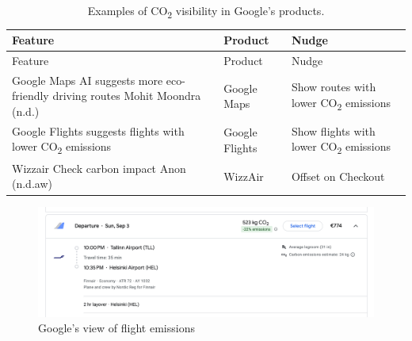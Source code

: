 \documentclass[
  letterpaper,
  DIV=11,
  numbers=noendperiod]{scrartcl}
\begin{document}
\begin{longtable}[]{@{}
  >{\raggedright\arraybackslash}p{}
  >{\raggedright\arraybackslash}p{}
  >{\raggedright\arraybackslash}p{}@{}}
\caption{Examples of CO\textsubscript{2} visibility in Google's
products.}\tabularnewline
\toprule\noalign{}
\begin{minipage}[b]{\linewidth}\raggedright
Feature
\end{minipage} & \begin{minipage}[b]{\linewidth}\raggedright
Product
\end{minipage} & \begin{minipage}[b]{\linewidth}\raggedright
Nudge
\end{minipage} \\
\midrule\noalign{}
\endfirsthead
\toprule\noalign{}
\begin{minipage}[b]{\linewidth}\raggedright
Feature
\end{minipage} & \begin{minipage}[b]{\linewidth}\raggedright
Product
\end{minipage} & \begin{minipage}[b]{\linewidth}\raggedright
Nudge
\end{minipage} \\
\midrule\noalign{}
\endhead
\bottomrule\noalign{}
\endlastfoot
Google Maps AI suggests more eco-friendly driving routes Mohit Moondra
(n.d.) & Google Maps & Show routes with lower CO\textsubscript{2}
emissions \\
Google Flights suggests flights with lower CO\textsubscript{2} emissions
& Google Flights & Show flights with lower CO\textsubscript{2}
emissions \\
Wizzair Check carbon impact Anon (n.d.aw) & WizzAir & Offset on
Checkout \\
\end{longtable}

\begin{figure}[H]

{\centering \includegraphics[width=1\linewidth,height=\textheight,keepaspectratio]{./images/design/flight-emissions.png}

}

\caption{Google's view of flight emissions}

\end{figure}%
\end{document}
